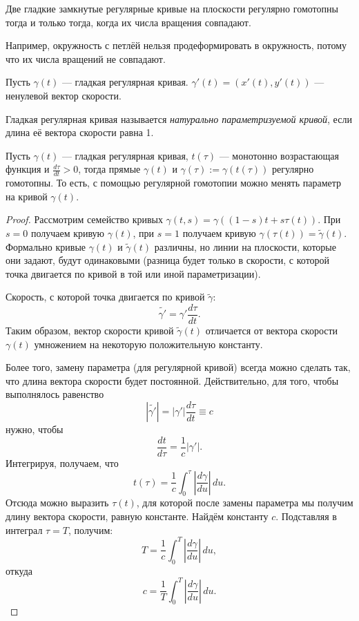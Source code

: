 \begin{theorem}[Уитни]
    Две гладкие замкнутые регулярные кривые на плоскости регулярно гомотопны тогда и только тогда, когда их числа вращения совпадают.
\end{theorem}

Например, окружность с петлёй нельзя продеформировать в окружность, потому что их числа вращений не совпадают.

Пусть $\gamma(t)$ — гладкая регулярная кривая. $\gamma'(t) = (x'(t), y'(t))$ — ненулевой вектор скорости.

\begin{definition}
    Гладкая регулярная кривая называется \textit{натурально параметризуемой кривой}, если длина её вектора скорости равна 1.
\end{definition} 



\begin{statement}
    Пусть $\gamma(t)$ — гладкая регулярная кривая, $t(\tau)$ — монотонно возрастающая функция и $\frac{d\tau}{dt} > 0$, тогда прямые $\gamma(t)$ и $\gamma(\tau):= \gamma(t(\tau))$ регулярно гомотопны. То есть, с помощью регулярной гомотопии можно менять параметр на кривой $\gamma(t)$.
\end{statement} 
\begin{proof}
    Рассмотрим семейство кривых $\gamma(t,s) = \gamma\left((1-s)t + s \tau(t)\right)$.
    При $s=0$ получаем кривую $\gamma(t)$, при $s=1$ получаем кривую $\gamma(\tau(t)) = \tilde{\gamma}(t)$.
    Формально кривые $\gamma(t)$ и $\tilde{\gamma}(t)$ различны, но линии на плоскости, которые они задают, будут одинаковыми (разница будет только в скорости, с которой точка двигается по кривой в той или иной параметризации).

    Скорость, с которой точка двигается по кривой $\tilde{\gamma}$:
    \[\tilde{\gamma'} = \gamma' \frac{d\tau}{dt}.\]
    Таким образом, вектор скорости кривой $\tilde{\gamma}(t)$ отличается от вектора скорости $\gamma(t)$ умножением на некоторую положительную константу.

    Более того, замену параметра (для регулярной кривой) всегда можно сделать так, что длина вектора скорости будет постоянной. Действительно, для того, чтобы выполнялось равенство
    \[|\tilde{\gamma'}| = |\gamma'|\frac{d\tau}{dt} \equiv c\]
    нужно, чтобы
    \[\frac{dt}{d\tau} = \frac{1}{c}|\gamma'|.\]
    Интегрируя, получаем, что
    \[t(\tau) = \frac{1}{c} \int_{0}^{\tau} \left|\frac{d\gamma}{du}\right| \, du.\]
    Отсюда можно выразить $\tau(t)$, для которой после замены параметра мы получим длину вектора скорости, равную константе. Найдём константу $c$.
    Подставляя в интеграл $\tau = T$, получим:
    \[T = \frac{1}{c} \int_{0}^{T}\left|\frac{d\gamma}{du}\right| \, du,\]
    откуда
    \[c = \frac{1}{T} \int_{0}^{T}\left|\frac{d\gamma}{du}\right| \, du.\]
\end{proof} 
